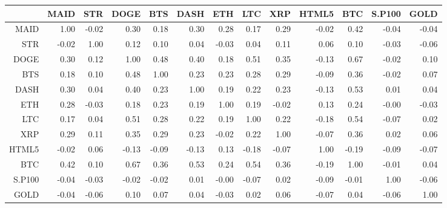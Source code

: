 \begin{table}[ht]
\centering
\begin{tabular}{rrrrrrrrrrrrr}
  \hline
 & MAID & STR & DOGE & BTS & DASH & ETH & LTC & XRP & HTML5 & BTC & S.P100 & GOLD \\ 
  \hline
MAID & 1.00 & -0.02 & 0.30 & 0.18 & 0.30 & 0.28 & 0.17 & 0.29 & -0.02 & 0.42 & -0.04 & -0.04 \\ 
  STR & -0.02 & 1.00 & 0.12 & 0.10 & 0.04 & -0.03 & 0.04 & 0.11 & 0.06 & 0.10 & -0.03 & -0.06 \\ 
  DOGE & 0.30 & 0.12 & 1.00 & 0.48 & 0.40 & 0.18 & 0.51 & 0.35 & -0.13 & 0.67 & -0.02 & 0.10 \\ 
  BTS & 0.18 & 0.10 & 0.48 & 1.00 & 0.23 & 0.23 & 0.28 & 0.29 & -0.09 & 0.36 & -0.02 & 0.07 \\ 
  DASH & 0.30 & 0.04 & 0.40 & 0.23 & 1.00 & 0.19 & 0.22 & 0.23 & -0.13 & 0.53 & 0.01 & 0.04 \\ 
  ETH & 0.28 & -0.03 & 0.18 & 0.23 & 0.19 & 1.00 & 0.19 & -0.02 & 0.13 & 0.24 & -0.00 & -0.03 \\ 
  LTC & 0.17 & 0.04 & 0.51 & 0.28 & 0.22 & 0.19 & 1.00 & 0.22 & -0.18 & 0.54 & -0.07 & 0.02 \\ 
  XRP & 0.29 & 0.11 & 0.35 & 0.29 & 0.23 & -0.02 & 0.22 & 1.00 & -0.07 & 0.36 & 0.02 & 0.06 \\ 
  HTML5 & -0.02 & 0.06 & -0.13 & -0.09 & -0.13 & 0.13 & -0.18 & -0.07 & 1.00 & -0.19 & -0.09 & -0.07 \\ 
  BTC & 0.42 & 0.10 & 0.67 & 0.36 & 0.53 & 0.24 & 0.54 & 0.36 & -0.19 & 1.00 & -0.01 & 0.04 \\ 
  S.P100 & -0.04 & -0.03 & -0.02 & -0.02 & 0.01 & -0.00 & -0.07 & 0.02 & -0.09 & -0.01 & 1.00 & -0.06 \\ 
  GOLD & -0.04 & -0.06 & 0.10 & 0.07 & 0.04 & -0.03 & 0.02 & 0.06 & -0.07 & 0.04 & -0.06 & 1.00 \\ 
   \hline
\end{tabular}
\end{table}
